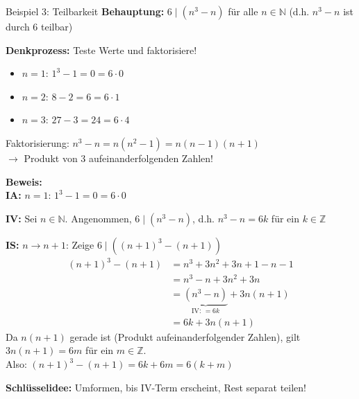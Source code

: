 \documentclass[a4paper, fontsize=7pt]{scrartcl}
\def\N{\mathbb{N}}  %
\def\Z{\mathbb{Z}}  %
\begin{document}
\begin{mainbox}{Beispiel 3: Teilbarkeit}
\textbf{Behauptung:} $6 \mid (n^3 - n)$ für alle $n \in \N$ (d.h. $n^3 - n$ ist durch 6 teilbar)

\textbf{Denkprozess:} Teste Werte und faktorisiere!
\begin{itemize}
  \item $n=1$: $1^3 - 1 = 0 = 6 \cdot 0$ \checkmark
  \item $n=2$: $8 - 2 = 6 = 6 \cdot 1$ \checkmark
  \item $n=3$: $27 - 3 = 24 = 6 \cdot 4$ \checkmark
\end{itemize}
Faktorisierung: $n^3 - n = n(n^2-1) = n(n-1)(n+1)$ \\
$\to$ Produkt von 3 aufeinanderfolgenden Zahlen!

\textbf{Beweis:}\\
\textbf{IA:} $n=1$: $1^3 - 1 = 0 = 6 \cdot 0$ \checkmark

\textbf{IV:} Sei $n \in \N$. Angenommen, $6 \mid (n^3 - n)$, d.h. $n^3 - n = 6k$ für ein $k \in \Z$

\textbf{IS:} $n \to n+1$: Zeige $6 \mid ((n+1)^3 - (n+1))$
\begin{align*}
(n+1)^3 - (n+1) &= n^3 + 3n^2 + 3n + 1 - n - 1\\
&= n^3 - n + 3n^2 + 3n\\
&= \underbrace{(n^3 - n)}_{\text{IV: } = 6k} + 3n(n+1)\\
&= 6k + 3n(n+1)
\end{align*}
Da $n(n+1)$ gerade ist (Produkt aufeinanderfolgender Zahlen), gilt $3n(n+1) = 6m$ für ein $m \in \Z$.\\
Also: $(n+1)^3 - (n+1) = 6k + 6m = 6(k+m)$ \checkmark

\textbf{Schlüsselidee:} Umformen, bis IV-Term erscheint, Rest separat teilen!
\end{mainbox}
\end{document}
